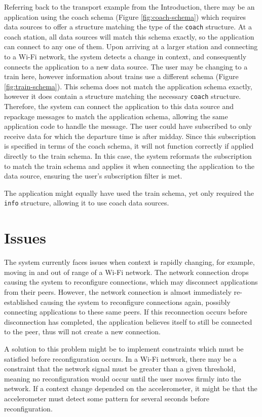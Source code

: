 \documentclass[12pt,twoside,notitlepage]{report}
\begin{document}
Referring back to the transport example from the Introduction, there may be an application using the coach schema (Figure \ref{fig:coach-schema}) which requires data sources to offer a structure matching the type of the {\tt coach} structure. 
At a coach station, all data sources will match this schema exactly, so the application can connect to any one of them. 
Upon arriving at a larger station and connecting to a Wi-Fi network, the system detects a change in context, and consequently connects the application to a new data source. 
The user may be changing to a train here, however information about trains use a different schema (Figure \ref{fig:train-schema}). 
This schema does not match the application schema exactly, however it does contain a structure matching the necessary {\tt coach} structure. 
Therefore, the system can connect the application to this data source and repackage messages to match the application schema, allowing the same application code to handle the message. 
The user could have subscribed to only receive data for which the departure time is after midday. 
Since this subscription is specified in terms of the coach schema, it will not function correctly if applied directly to the train schema. 
In this case, the system reformats the subscription to match the train schema and applies it when connecting the application to the data source, ensuring the user's subscription filter is met.

The application might equally have used the train schema, yet only required the {\tt info} structure, allowing it to use coach data sources.

\section{Issues}
The system currently faces issues when context is rapidly changing, for example, moving in and out of range of a Wi-Fi network. 
The network connection drops causing the system to reconfigure connections, which may disconnect applications from their peers.
However, the network connection is almost immediately re-established causing the system to reconfigure connections again, possibly connecting applications to these same peers. 
If this reconnection occurs before disconnection has completed, the application believes itself to still be connected to the peer, thus will not create a new connection.

A solution to this problem might be to implement constraints which must be satisfied before reconfiguration occurs. 
In a Wi-Fi network, there may be a constraint that the network signal must be greater than a given threshold, meaning no reconfiguration would occur until the user moves firmly into the network. 
If a context change depended on the accelerometer, it might be that the accelerometer must detect some pattern for several seconds before reconfiguration.
\end{document}
